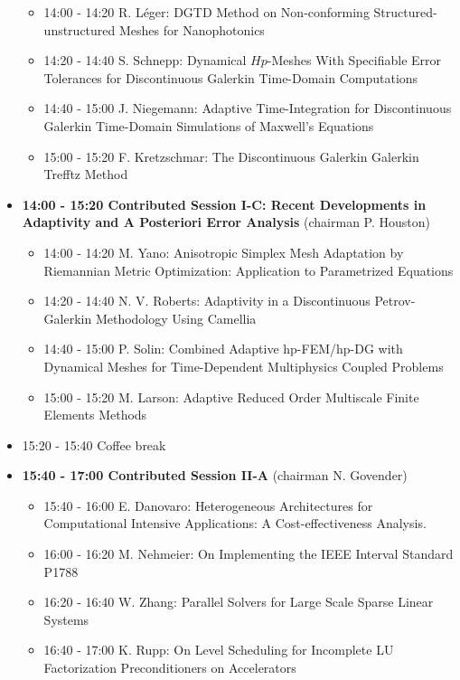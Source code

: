\documentclass[10pt, A4]{article}%
\begin{document}
\begin{itemize}
  \begin{itemize}
    \item 14:00 - 14:20 {R. Léger}: {DGTD  Method  on  Non-conforming  Structured-unstructured  Meshes  for Nanophotonics}
    \item 14:20 - 14:40 {S. Schnepp}: {Dynamical $Hp$-Meshes With Specifiable Error Tolerances for Discontinuous Galerkin Time-Domain Computations}
    \item 14:40 - 15:00 {J. Niegemann}: {Adaptive Time-Integration for Discontinuous Galerkin Time-Domain Simulations of Maxwell's Equations}
    \item 15:00 - 15:20 {F. Kretzschmar}: {The Discontinuous Galerkin Galerkin Trefftz Method}
  \end{itemize}
    \item {\bf 14:00 - 15:20 Contributed Session I-C: Recent Developments in Adaptivity and A Posteriori Error Analysis} (chairman P. Houston) 
  \begin{itemize}
    \item 14:00 - 14:20 {M. Yano}: {Anisotropic Simplex Mesh Adaptation by Riemannian Metric Optimization: Application to Parametrized Equations}
    \item 14:20 - 14:40 {N. V. Roberts}: {Adaptivity in a Discontinuous Petrov-Galerkin Methodology Using Camellia}
    \item 14:40 - 15:00 {P. Solin}: Combined Adaptive hp-FEM/hp-DG with Dynamical Meshes for Time-Dependent Multiphysics Coupled Problems
    \item 15:00 - 15:20 {M. Larson}: Adaptive Reduced Order Multiscale Finite Elements Methods
  \end{itemize}
  \item 15:20 - 15:40 Coffee break
  \newpage
  \item {\bf 15:40 - 17:00 Contributed Session II-A} (chairman N. Govender) 
  \begin{itemize}
    \item 15:40 - 16:00 {E. Danovaro}: {Heterogeneous Architectures for Computational Intensive Applications: A Cost-effectiveness Analysis.}
    \item 16:00 - 16:20 {M. Nehmeier}: {On Implementing the IEEE Interval Standard P1788}
    \item 16:20 - 16:40 {W. Zhang}: {Parallel Solvers for Large Scale Sparse Linear Systems} %
    \item 16:40 - 17:00 {K. Rupp}: {On Level Scheduling for Incomplete LU Factorization Preconditioners on Accelerators}

\end{itemize}
\end{itemize}
\end{document}
